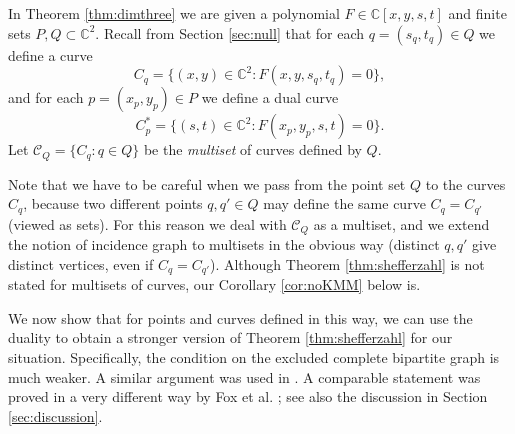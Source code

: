 \documentclass{daj}
\theoremstyle{definition}
\newcommand{\C}{\mathbb C}
\newcommand{\cvs}{\mathcal C}
\begin{document}
In Theorem \ref{thm:dimthree} we are given a polynomial $F\in \C[x,y,s,t]$ and finite sets $P,Q\subset\C^2$.
Recall from Section \ref{sec:null} that for each $q=(s_q,t_q)\in Q$ we define a curve
\[C_q %
= \{(x,y)\in\C^2:F(x,y,s_q,t_q)=0\},\]
and for each $p=(x_p,y_p)\in P$ we define a dual curve
\[C_p^* %
= \{(s,t)\in\C^2:F(x_p,y_p,s,t)=0\}.\]
Let $\cvs_Q=\{C_q: q\in Q\}$ be the \emph{multiset} of curves defined by $Q$.

Note that we have to be careful when we pass from the point set $Q$ to the curves $C_q$,
because two different points $q,q'\in Q$ may define the same curve $C_q = C_{q'}$ (viewed as sets).
For this reason we deal with $\cvs_Q$ as a multiset, and we extend the notion of incidence graph to multisets in the obvious way (distinct $q,q'$ give distinct vertices, even if $C_q = C_{q'}$).
Although Theorem \ref{thm:shefferzahl} is not stated for multisets of curves, our Corollary \ref{cor:noKMM} below is.

We now show that for points and curves defined in this way, we can use the duality to obtain a stronger version of Theorem \ref{thm:shefferzahl} for our situation. 
Specifically, the condition on the excluded complete bipartite graph is much weaker.
A similar argument was used in \cite[Lemma 3.4]{PZ}.
A comparable statement was proved in a very different way by Fox et al. \cite{FPSSZ}; see also the discussion in Section \ref{sec:discussion}.
\end{document}
